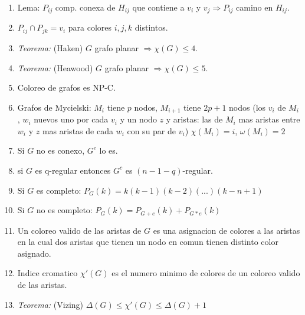 \begin{enumerate}
\item Lema: $P_{ij}$ comp. conexa de $H_{ij}$ que contiene a $v_{i}$ y $v_{j} \Rightarrow P_{ij}$ camino en $H_{ij}$.
\item $P_{ij} \cap P_{jk} = {v_{i}}$ para colores $i,j,k$ distintos.
\item \textit{Teorema:} (Haken) $G$ grafo planar $\Rightarrow \chi(G) \leq 4$.
\item \textit{Teorema:} (Heawood) $G$ grafo planar $\Rightarrow \chi(G) \leq 5$.
\item Coloreo de grafos es NP-C.
\item Grafos de Mycielski: $M_{i}$ tiene $p$ nodos, $M_{i+1}$ tiene $2p+1$ nodos (los $v_{i}$ de $M_{i}$, $w_{i}$ nuevos uno por cada $v_{i}$ y un nodo $z$ y aristas: las de $M_{i}$ mas aristas entre $w_{i}$ y $z$ mas aristas de cada $w_{i}$ con su par de $v_{i}$) $\chi(M_{i})=i$, $\omega(M_{i})=2$
\item Si $G$ no es conexo, $G^{c}$ lo es.
\item si $G$ es q-regular entonces $G^{c}$ es $(n-1-q)$-regular.
\item Si $G$ es completo: $P_{G}(k)= k(k-1)(k-2)(...)(k-n+1)$
\item Si $G$ no es completo: $P_{G}(k)= P_{G+e}(k) + P_{G*e}(k)$
\item Un coloreo valido de las aristas de $G$ es una asignacion de colores a las aristas en la cual dos aristas que tienen un nodo en comun tienen distinto color asignado.
\item Indice cromatico $\chi'(G)$ es el numero minimo de colores de un coloreo valido de las aristas.
\item \textit{Teorema:} (Vizing) $\Delta(G) \leq \chi'(G) \leq \Delta(G)+1$
\end{enumerate}
